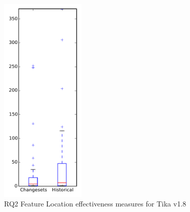 
\begin{figure}[t]
\centering
\includegraphics[width=0.36\textwidth]{figures/flt/rq2_tika}
\caption{RQ2 Feature Location effectiveness measures for Tika v1.8}
\label{fig:flt:rq2:tika}
\end{figure}
